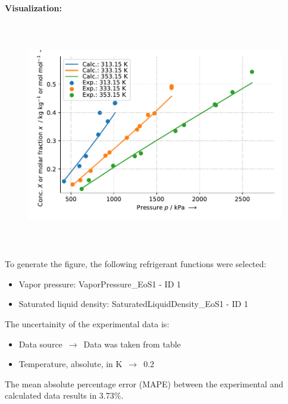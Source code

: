 \textbf{Visualization:}
%
\begin{figure}[!htp]
{\noindent\includegraphics[height=10cm, keepaspectratio]{figs/abs/abs_R-134a_lubricant_BAB32_MixingRule_1.pdf}}
\end{figure}
%

To generate the figure, the following refrigerant functions were selected:
\begin{itemize}
\item Vapor pressure: VaporPressure\_EoS1 - ID 1
\item Saturated liquid density: SaturatedLiquidDensity\_EoS1 - ID 1
\end{itemize}

The uncertainity of the experimental data is:
\begin{itemize}
\item Data source $\,\to\,$ Data was taken from table
\item Temperature, absolute, in $\si{\kelvin}$ $\,\to\,$ 0.2
\end{itemize}

The mean absolute percentage error (MAPE) between the experimental and calculated data results in 3.73\%.
\FloatBarrier
\newpage
